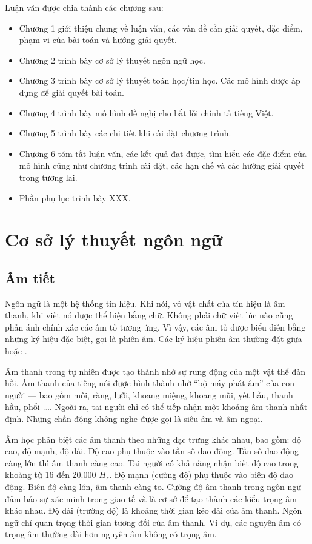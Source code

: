 \documentclass[a4paper,oneside,14pt]{extbook} %
\begin{document}
Luận văn được chia thành các chương sau:
\begin{itemize}
\item Chương 1 giới thiệu chung về luận văn, các vấn đề cần giải
  quyết, đặc điểm, phạm vi của bài toán và hướng giải quyết.
\item Chương 2 trình bày cơ sở lý thuyết ngôn ngữ học.
\item Chương 3 trình bày cơ sở lý thuyết toán học/tin học. Các mô hình
  được áp dụng để giải quyết bài toán.
\item Chương 4 trình bày mô hình đề nghị cho bắt lỗi chính tả tiếng Việt.
\item Chương 5 trình bày các chi tiết khi cài đặt chương trình.
\item Chương 6 tóm tắt luận văn, các kết quả đạt được, tìm hiểu các
  đặc điểm của mô hình   cũng như chương trình cài đặt, các hạn chế và
  các hướng giải quyết   trong tương lai.
\item Phần phụ lục trình bày XXX.
\end{itemize}

\chapter{Cơ sở lý thuyết ngôn ngữ}
\label{cha:vietnamese}
\minitoc


\section{Âm tiết}

Ngôn ngữ là một hệ thống tín hiệu. Khi nói, vỏ vật chất của tín hiệu
là âm thanh, khi viết nó được thể hiện bằng chữ. Không phải chữ viết
lúc nào cũng phản ánh chính xác các âm tố tương ứng. Vì vậy, các âm tố
được biểu diễn bằng những ký hiệu đặc biệt, gọi là phiên âm. Các ký
hiệu phiên âm thường đặt giữa \textipa{/\quad/} hoặc
\textipa{[\quad]}.

Âm thanh trong tự nhiên được tạo thành nhờ sự rung động của một vật
thể đàn hồi. Âm thanh của tiếng nói được hình thành nhờ ``bộ máy phát
âm'' của con người --- bao gồm môi, răng, lưỡi, khoang miệng, khoang
mũi, yết hầu, thanh hầu, phổi~\ldots{}. Ngoài ra, tai người chỉ có thể
tiếp nhận một khoảng âm thanh nhất định. Những chấn động không nghe
được gọi là siêu âm và âm ngoại.

Âm học phân biệt các âm thanh theo những đặc trưng khác nhau, bao gồm:
độ cao, độ mạnh, độ dài. Độ cao phụ thuộc vào tần số dao động. Tần số
dao động càng lớn thì âm thanh càng cao. Tai người có khả năng nhận
biết độ cao trong khoảng từ 16 đến 20.000 $H_z$. Độ mạnh (cường độ)
phụ thuộc vào biên độ dao động. Biên độ càng lớn, âm thanh càng
to. Cường độ âm thanh trong ngôn ngữ đảm bảo sự xác minh trong giao tế
và là cơ sở để tạo thành các kiểu trọng âm khác nhau. Độ dài (trường
độ) là khoảng thời gian kéo dài của âm thanh. Ngôn ngữ chỉ quan trọng
thời gian tương đối của âm thanh. Ví dụ, các nguyên âm có trọng âm
thường dài hơn nguyên âm không có trọng âm.
\end{document}
